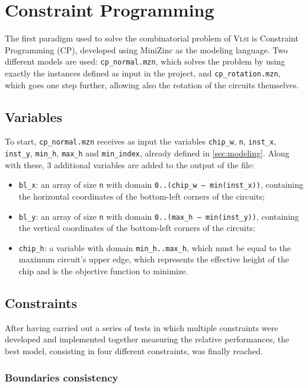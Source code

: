 \documentclass[a4paper, 12pt]{article}
\begin{document}
\section{Constraint Programming}\label{sec:cp}

The first paradigm used to solve the combinatorial problem of \textsc{Vlsi} is Constraint Programming (CP), developed using MiniZinc as the modeling language. Two different models are used: \verb|cp_normal.mzn|, which solves the problem by using exactly the instances defined as input in the project, and \verb|cp_rotation.mzn|, which goes one step further, allowing also the rotation of the circuits themselves.


\subsection{Variables}

To start, \verb|cp_normal.mzn| receives as input the variables \verb|chip_w|, \verb|n|, \verb|inst_x|, \verb|inst_y|, \verb|min_h|, \verb|max_h| and \verb|min_index|, already defined in \cref{sec:modeling}. Along with these, 3 additional variables are added to the output of the file:
\begin{itemize}
    \item \verb|bl_x|: an array of size \verb|n| with domain \verb|0..(chip_w – min(inst_x))|, containing the horizontal coordinates of the bottom-left corners of the circuits;
    \item \verb|bl_y|: an array of size \verb|n| with domain \verb|0..(max_h – min(inst_y))|, containing the vertical coordinates of the bottom-left corners of the circuits;
    \item \verb|chip_h|: a variable with domain \verb|min_h..max_h|, which must be equal to the maximum circuit's upper edge, which represents the effective height of the chip and is the objective function to minimize.
\end{itemize}


\subsection{Constraints}

After having carried out a series of tests in which multiple constraints were developed and implemented together measuring the relative performances, the best model, consisting in four different constraints, was finally reached.


\subsubsection{Boundaries consistency}
\end{document}
